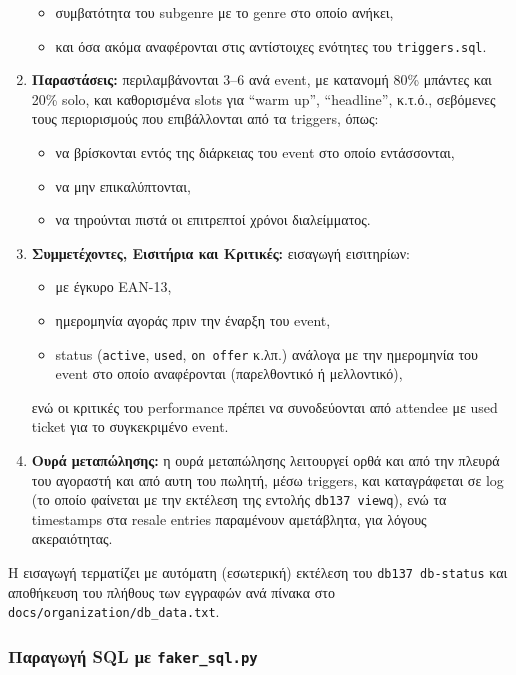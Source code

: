 \documentclass[13pt]{extarticle}
\begin{document}
\begin{enumerate}
\begin{itemize}
        \item συμβατότητα του subgenre με το genre στο οποίο ανήκει,
        \item και όσα ακόμα αναφέρονται στις αντίστοιχες ενότητες του \texttt{triggers.sql}.
    \end{itemize}
    \clearpage
    \item \textbf{Παραστάσεις:} περιλαμβάνονται 3–6 ανά event, με κατανομή 80\% μπάντες και 20\% solo, και καθορισμένα slots για ``warm up'', ``headline'', κ.τ.ό., σεβόμενες τους περιορισμούς που επιβάλλονται από τα triggers, όπως:
    \begin{itemize}
        \item να βρίσκονται εντός της διάρκειας του event στο οποίο εντάσσονται,
        \item να μην επικαλύπτονται,
        \item να τηρούνται πιστά οι επιτρεπτοί χρόνοι διαλείμματος.
    \end{itemize}
    \item \textbf{Συμμετέχοντες, Εισιτήρια και Κριτικές:} εισαγωγή εισιτηρίων:
    \begin{itemize}
        \item με έγκυρο EAN-13,
        \item ημερομηνία αγοράς πριν την έναρξη του event,
        \item status (\texttt{active}, \texttt{used}, \texttt{on offer} κ.λπ.) ανάλογα με την ημερομηνία του event στο οποίο αναφέρονται (παρελθοντικό ή μελλοντικό),
    \end{itemize}
    ενώ οι κριτικές του performance πρέπει να συνοδεύονται από attendee με used ticket για το συγκεκριμένο event.
    \item \textbf{Ουρά μεταπώλησης:} η ουρά μεταπώλησης λειτουργεί ορθά και από την πλευρά του αγοραστή και από αυτη του πωλητή, μέσω triggers, και καταγράφεται σε log (το οποίο φαίνεται με την εκτέλεση της εντολής \texttt{db137 viewq}), ενώ τα timestamps στα resale entries παραμένουν αμετάβλητα, για λόγους ακεραιότητας.
\end{enumerate}

Η εισαγωγή τερματίζει με αυτόματη (εσωτερική) εκτέλεση του \texttt{db137 db-status} και αποθήκευση του πλήθους των εγγραφών ανά πίνακα στο \texttt{docs/organization/db\_data.txt}.

\subsubsection{Παραγωγή SQL με \texttt{faker\_sql.py}}
\end{document}

